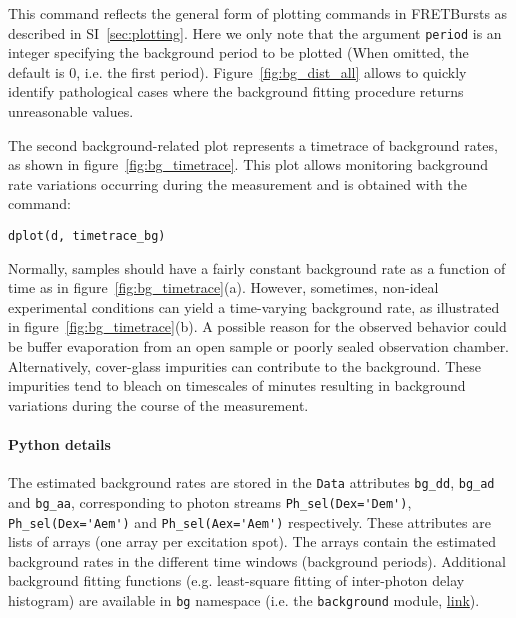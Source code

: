 This command reflects the general form of plotting commands in FRETBursts 
as described in SI~\ref{sec:plotting}.
Here we only note that the argument \verb|period| is an integer specifying the background 
period to be plotted (When omitted, the default is 0, i.e. the first period).
Figure~\ref{fig:bg_dist_all} allows to quickly identify pathological cases where the 
background fitting procedure returns unreasonable values. 

The second background-related plot represents a timetrace of background rates, 
as shown in figure~\ref{fig:bg_timetrace}. This plot allows monitoring background rate variations
occurring during the measurement and is obtained with the command:

\begin{lstlisting}
dplot(d, timetrace_bg)
\end{lstlisting}

Normally, samples should have a fairly constant background rate as a function of time
as in figure~\ref{fig:bg_timetrace}(a). However, sometimes, non-ideal
experimental conditions can yield a time-varying background rate, as illustrated in
figure~\ref{fig:bg_timetrace}(b).
A possible reason for the observed behavior could be buffer evaporation from an open sample 
or poorly sealed observation chamber. Alternatively,
cover-glass impurities can contribute to the background.
These impurities tend to bleach on timescales of minutes resulting in
background variations during the course of the measurement.

\paragraph{Python details} 

The estimated background rates are stored in the \verb|Data| attributes
\verb|bg_dd|, \verb|bg_ad| and \verb|bg_aa|, corresponding to photon
streams \verb|Ph_sel(Dex='Dem')|, \verb|Ph_sel(Dex='Aem')| and \verb|Ph_sel(Aex='Aem')|
respectively.
These attributes are lists of arrays (one array per excitation spot).
The arrays contain the estimated background rates in the different time windows
(background periods).
Additional background fitting functions (e.g. least-square fitting of inter-photon delay
histogram) are available in \verb|bg| namespace 
(i.e. the \verb|background| module, 
\href{http://fretbursts.readthedocs.org/en/latest/background.html}{link}). 
